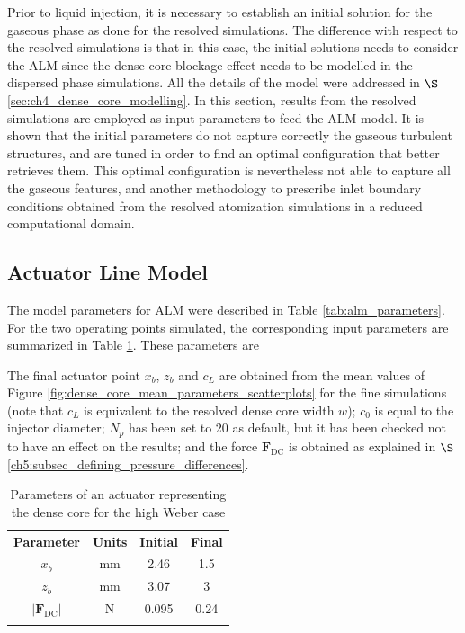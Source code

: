 Prior to liquid injection, it is necessary to establish an initial solution for the gaseous phase as done for the resolved simulations. The difference with respect to the resolved simulations is that in this case, the initial solutions needs to consider the ALM since the dense core blockage effect needs to be modelled in the dispersed phase simulations. All the details of the model were addressed in $\S$\ref{sec:ch4_dense_core_modelling}. In this section, results from the resolved simulations are employed as input parameters to feed the ALM model. It is shown that the initial parameters do not capture correctly the gaseous turbulent structures, and are tuned in order to find an optimal configuration that better retrieves them. This optimal configuration is nevertheless not able to capture all the gaseous features, and another methodology to prescribe inlet boundary conditions obtained from the resolved atomization simulations in a reduced computational domain.


\subsection{Actuator Line Model}


The model parameters for ALM were described in Table \ref{tab:alm_parameters}. For the two operating points simulated, the corresponding input parameters are summarized in Table \ref{tab:jicf_lgs_ALM_parameters}. These parameters are 

The final actuator point $x_b$, $z_b$ and $c_L$ are obtained from the mean values of Figure \ref{fig:dense_core_mean_parameters_scatterplots} for the fine simulations (note that $c_L$ is equivalent to the resolved dense core width $w$); $c_0$ is equal to the injector diameter; $N_p$ has been set to 20 as default, but it has been checked not to have an effect on the results; and the force $\textbf{F}_\mathrm{DC}$ is obtained as explained in $\S$\ref{ch5:subsec_defining_pressure_differences}.

\begin{table}[!h]
\centering
\caption{Parameters of an actuator representing the dense core for the high Weber case}
\begin{tabular}{cccc}
\thickhline
\textbf{Parameter} & \textbf{Units} & \textbf{Initial} &  \textbf{Final} \\
\thickhline
$x_b$ & mm & 2.46 & 1.5 \\
$z_b$ & mm & 3.07 & 3 \\
$| \textbf{F}_\mathrm{DC} |$ & N & 0.095 & 0.24 \\
\thickhline
\end{tabular}
\label{tab:jicf_lgs_ALM_parameters}
\end{table}


